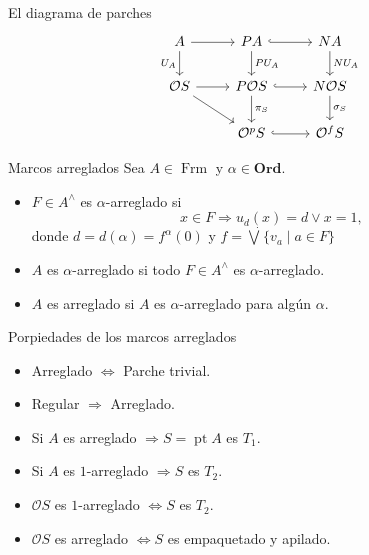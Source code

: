 \documentclass[compress,12pt]{beamer}
\DeclareMathOperator{\pt}{pt}
\DeclareMathOperator{\Frm}{Frm}
\begin{document}
\begin{frame}[fragile]{El diagrama de parches}
\begin{equation}\label{Diagrama de parches}
\begin{tikzcd}
	A & PA & NA \\
	{\mathcal{O}S} & {P\mathcal{O}S} & {N\mathcal{O}S} \\
	& {\mathcal{O}^pS} & {\mathcal{O}^fS}
	\arrow[from=1-1, to=1-2]
	\arrow["{U_A}"', from=1-1, to=2-1]
	\arrow[hook, from=1-2, to=1-3]
	\arrow["{PU_A}", from=1-2, to=2-2]
	\arrow["{NU_A}", from=1-3, to=2-3]
	\arrow[from=2-1, to=2-2]
	\arrow[from=2-1, to=3-2]
	\arrow[hook, from=2-2, to=2-3]
	\arrow["{\pi_S}", from=2-2, to=3-2]
	\arrow["{\sigma_S}", from=2-3, to=3-3]
	\arrow[hook, from=3-2, to=3-3]
\end{tikzcd}
\end{equation}
\end{frame}

\begin{frame}{Marcos arreglados}
Sea $A\in \Frm$ y $\alpha\in \mathbf{Ord}$. 
    \begin{itemize}
        \item<2-> $F\in A^\wedge$ es $\alpha$-arreglado si 
    \[
    x\in F\Rightarrow u_d(x)=d\vee x=1,
    \]
    donde $d=d(\alpha)=f^\alpha(0)$ y $f=\dot{\bigvee}\{v_a\mid a\in F\}$
    \item<3-> $A$ es $\alpha$-arreglado si todo $F\in A^\wedge$ es $\alpha$-arreglado.
    \item<4-> $A$ es arreglado si $A$ es $\alpha$-arreglado para algún $\alpha$.
    \end{itemize}
\end{frame}

\begin{frame}{Porpiedades de los marcos arreglados}
\begin{itemize}
	\item Arreglado $\Leftrightarrow$ Parche trivial.
	\item Regular $\Rightarrow$ Arreglado.
	\item Si $A$ es arreglado $\Rightarrow S=\pt A$ es $T_1$.
	\item Si $A$ es $1$-arreglado $\Rightarrow S$ es $T_2$.
	\item $\mathcal{O}S$ es $1$-arreglado $\Leftrightarrow S$ es $T_2$.
	\item $\mathcal{O}S$ es arreglado $\Leftrightarrow S$ es empaquetado y apilado.  
\end{itemize}
\end{frame}
\end{document}
